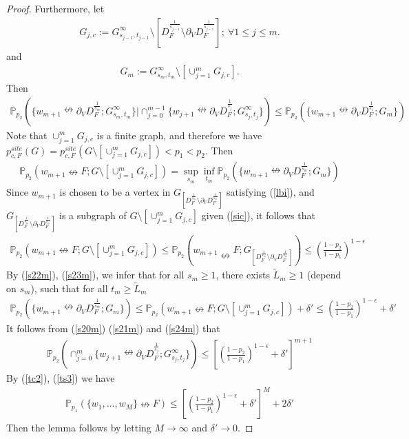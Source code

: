 \documentclass[10pt,a4paper]{amsart}
\newcommand\PP{{\mathbb P}}
\begin{document}
\begin{proof}
Furthermore, let
\begin{align*}
G_{j,c}:=G_{s_{j-1},t_{j-1}}^{\infty}\setminus [D_F^{\frac{1}{s_{j-1}}}\setminus \partial_V D_F^{\frac{1}{s_{j-1}}}];\ \forall 1\leq j\leq m.
\end{align*}
and
\begin{align*}
G_m:=G_{s_m,t_m}^{\infty}\setminus[\cup_{j=1}^m G_{j,c}].
\end{align*}
Then
\begin{align}
\PP_{p_2}(\{w_{m+1}\nleftrightarrow \partial_V D_F^{\frac{1}{s_m}};G_{s_m,t_m}^{\infty}\}|\cap_{j=0}^{m-1}\{w_{j+1}\nleftrightarrow \partial_V D_F^{\frac{1}{s_j}};G_{s_j,t_j}^{\infty}\})\leq \PP_{p_2}(\{w_{m+1}\nleftrightarrow \partial_V D_F^{\frac{1}{s_1}};G_m\})\label{s21m}
\end{align}
Note that $\cup_{j=1}^mG_{j,c}$ is a finite graph, and therefore we have $p_{c,F}^{site}(G)=p_{c,F}^{site}(G\setminus [\cup_{j=1}^mG_{j,c}])<p_1<p_2$. Then
\begin{align}
\PP_{p_2}(w_{m+1}\nleftrightarrow F; G\setminus [\cup_{j=1}^m G_{j,c}])=
\sup_{s_m}\inf_{t_m}\PP_{p_2}(\{w_{m+1}\nleftrightarrow \partial_V D_F^{\frac{1}{s_m}};G_m\})\label{s22m}
\end{align}
Since $w_{m+1}$ is chosen to be a vertex in $G_{\left[D_{F}^{\frac{1}{s_m}}\setminus \partial_VD_{F}^{\frac{1}{s_m}}\right]}$ satisfying (\ref{lbi}), and $G_{\left[D_{F}^{\frac{1}{s_m}}\setminus \partial_VD_{F}^{\frac{1}{s_m}}\right]}$ is a subgraph of $G\setminus [\cup_{j=1}^mG_{j,c}]$ given (\ref{sic}), it follows that 
\begin{align}
\PP_{p_2}(w_{m+1}\nleftrightarrow F; G\setminus [\cup_{j=1}^mG_{j,c}])\leq \PP_{p_2}\left(w_{m+1}\nleftrightarrow F; G_{\left[D_{F}^{\frac{1}{s_m}}\setminus \partial_VD_{F}^{\frac{1}{s_m}}\right]}\right)\leq\left(\frac{1-p_2}{1-p_1}\right)^{1-\epsilon}\label{s23m}
\end{align}
By (\ref{s22m}), (\ref{s23m}), we infer that for all $s_m\geq 1$, there exists $\tilde{L}_m\geq 1$ (depend on $s_m$), such that for all $t_m\geq \tilde{L}_m$
\begin{align}
 \PP_{p_2}(\{w_{m+1}\nleftrightarrow \partial_V D_F^{\frac{1}{s_m}};G_m\})\le \PP_{p_2}(w_{m+1}\nleftrightarrow F;G\setminus [\cup_{j=1}^mG_{j,c}])+\delta'\leq \left(\frac{1-p_2}{1-p_1}\right)^{1-\epsilon}+\delta'\label{s24m}
\end{align}
It follows from (\ref{s20m}) (\ref{s21m}) and (\ref{s24m}) that
\begin{align}
\PP_{p_2}(\cap_{j=0}^{m}\{w_{j+1}\nleftrightarrow \partial_V D_F^{\frac{1}{s_j}};G_{s_j,t_j}^{\infty}\})\leq \left[\left(\frac{1-p_2}{1-p_1}\right)^{1-\epsilon}+\delta'\right]^{m+1}\label{ts3}
\end{align}
By (\ref{tc2}), (\ref{ts3}) we have
\begin{align*}
\PP_{p_1}(\{w_1,\ldots,w_M\}\nleftrightarrow F)\leq\left[\left(\frac{1-p_2}{1-p_1}\right)^{1-\epsilon}+\delta'\right]^{M}+2\delta' 
\end{align*}
Then the lemma follows by letting $M\rightarrow\infty$ and $\delta'\rightarrow 0$.
\end{proof}
\end{document}
